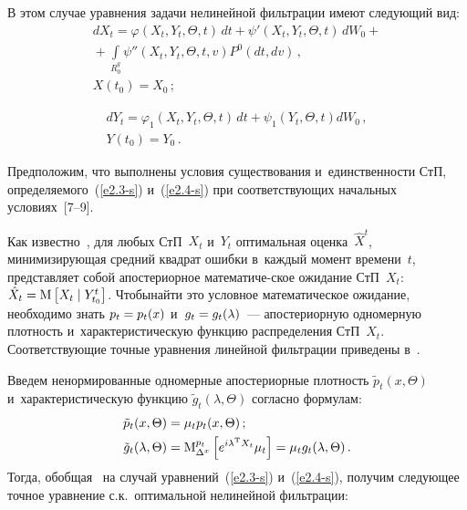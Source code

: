 \begin{multicols}{2}
В этом случае уравнения задачи нелинейной фильтрации имеют следующий вид:
\begin{multline}
    dX_t =\varphi \left(X_t, Y_t,\Theta, t\right)\,dt+\psi'\left(X_t, Y_t,\Theta, t\right)\,dW_0+{}\\
{}+\int\limits_{R_0^q} \psi''\left(X_t, Y_t,\Theta, t,v\right) P^0 (dt, dv)\,,\\  
X\left(t_0\right) = X_0\,;
\label{e2.3-s}
\end{multline}

\vspace*{-12pt}

\noindent
\begin{multline}
    dY_t =\varphi_1 \left(X_t, Y_t,\Theta, t\right)\,dt +
    \psi_1 \left(Y_t,\Theta, t\right) dW_0\,,\\ 
    Y\left(t_0\right) = Y_0\,.
    \label{e2.4-s}
    \end{multline}
    

Предположим, что выполнены условия существования и~единственности СтП, 
определяемого~(\ref{e2.3-s}) и~(\ref{e2.4-s}) при соответствующих начальных 
условиях~[7--9].

Как известно~\cite{6-s, 9-s}, для любых СтП~$X_t$ и~$Y_t$ оптимальная оценка~$\hat X^t$, 
минимизирующая средний квадрат ошибки в~каждый момент времени~$t$, 
представляет собой апостериорное математиче-\linebreak ское ожидание СтП~$X_t$: 
$\hat X_t\hm = \mm \lk X_t \mid Y_{t_0}^t\rk$. Чтобы\linebreak найти
 это условное 
математическое ожидание, необходи\-мо знать $p_t \hm= p_t (x)$ и~$g_t\hm=g_t(\lambda)$~--- 
апостериорную одномерную плот\-ность и~характеристи\-ческую функ\-цию распределения 
СтП~$X_t$. Со\-от\-вет\-ст\-ву\-ющие точные уравнения линейной фильтрации приведены в~\cite{3-s}.

Введем ненормированные одномерные апостериорные плотность $\tilde p_t (x,\Theta)$  
и~характеристическую функцию $\tilde g_t (\lambda,\Theta)$ согласно формулам:
    \begin{align*}
    \tilde{p}_t (x,\Theta) &= \mu_t p_t (x,\Theta)\,; \\
    \tilde{g}_t (\lambda,\Theta) &= 
    {\rm M}_{\Delta^x}^{p_t} \left[ e^{i\lambda^{\mathrm{T}} X_t} \mu_t\right] =
    \mu_t g_t (\lambda,\Theta)\,.
    \end{align*}
Тогда, обобщая~\cite{6-s} на случай уравнений~(\ref{e2.3-s}) и~(\ref{e2.4-s}), 
получим следующее точное уравнение с.к.\ 
оптимальной нелинейной фильт\-рации:


\end{multicols}
